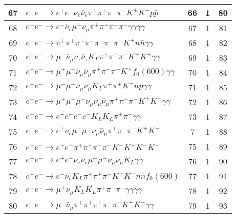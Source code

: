 \documentclass[landscape]{article}
\begin{document}
\begin{table}[htbp!]
\begin{tabular}{|c|>{\centering}p{18cm}|c|c|c|}
\hline
67 & $ e^{+} e^{-} \rightarrow e^{+} e^{-} \nu_{e} \bar{\nu}_{e} \pi^{+} \pi^{+} \pi^{-} \pi^{-} K^{+} K^{-} p \bar{p} $ & 66 & 1 & 80 \\
\hline
68 & $ e^{+} e^{-} \rightarrow e^{-} \bar{\nu}_{e} \mu^{+} \nu_{\mu} \pi^{+} \pi^{+} \pi^{-} \pi^{-} \gamma \gamma \gamma \gamma $ & 67 & 1 & 81 \\
\hline
69 & $ e^{+} e^{-} \rightarrow \pi^{+} \pi^{+} \pi^{+} \pi^{-} \pi^{-} \pi^{-} \pi^{-} K^{+} n \bar{n} \gamma \gamma $ & 68 & 1 & 82 \\
\hline
70 & $ e^{+} e^{-} \rightarrow \mu^{-} \bar{\nu}_{\mu} \nu_{\tau} \bar{\nu}_{\tau} K_{L} \pi^{+} \pi^{-} \pi^{-} K^{+} K^{+} \gamma \gamma $ & 69 & 1 & 83 \\
\hline
71 & $ e^{+} e^{-} \rightarrow \mu^{+} \mu^{-} \nu_{\mu} \bar{\nu}_{\mu} \pi^{+} \pi^{-} \pi^{-} K^{+} f_{0}(600) \gamma \gamma $ & 70 & 1 & 84 \\
\hline
72 & $ e^{+} e^{-} \rightarrow \mu^{-} \mu^{-} \bar{\nu}_{\mu} \bar{\nu}_{\mu} K_{L} \pi^{+} \pi^{+} K^{-} \bar{n} p \gamma \gamma $ & 71 & 1 & 85 \\
\hline
73 & $ e^{+} e^{-} \rightarrow \mu^{+} \mu^{+} \mu^{-} \nu_{\mu} \nu_{\mu} \bar{\nu}_{\mu} \pi^{+} \pi^{-} \pi^{-} K^{+} K^{-} \gamma \gamma $ & 72 & 1 & 86 \\
\hline
74 & $ e^{+} e^{-} \rightarrow e^{+} e^{+} e^{-} e^{-} K_{L} K_{L} \pi^{+} \pi^{-} \gamma \gamma $ & 73 & 1 & 87 \\
\hline
75 & $ e^{+} e^{-} \rightarrow e^{+} \nu_{e} \mu^{+} \mu^{-} \nu_{\mu} \bar{\nu}_{\mu} \pi^{+} \pi^{-} \pi^{-} K^{+} K^{-} $ & 7 & 1 & 88 \\
\hline
76 & $ e^{+} e^{-} \rightarrow e^{+} e^{-} \pi^{+} \pi^{+} \pi^{-} \pi^{-} K^{+} K^{+} K^{-} K^{-} $ & 75 & 1 & 89 \\
\hline
77 & $ e^{+} e^{-} \rightarrow e^{+} e^{-} \nu_{e} \bar{\nu}_{e} \mu^{+} \mu^{-} \nu_{\mu} \bar{\nu}_{\mu} K_{L} \gamma \gamma $ & 76 & 1 & 90 \\
\hline
78 & $ e^{+} e^{-} \rightarrow e^{-} \bar{\nu}_{e} K_{L} \pi^{+} \pi^{+} \pi^{-} K^{+} K^{-} n \bar{n} f_{0}(600) $ & 77 & 1 & 91 \\
\hline
79 & $ e^{+} e^{-} \rightarrow \mu^{+} \nu_{\mu} K_{L} K_{L} \pi^{+} \pi^{-} \pi^{-} \gamma \gamma \gamma \gamma $ & 78 & 1 & 92 \\
\hline
80 & $ e^{+} e^{-} \rightarrow \mu^{-} \bar{\nu}_{\mu} \pi^{+} \pi^{+} \pi^{+} \pi^{-} \pi^{-} K^{+} K^{-} \gamma \gamma $ & 79 & 1 & 93 \\
\hline
\end{tabular}
\end{table}
\end{document}
